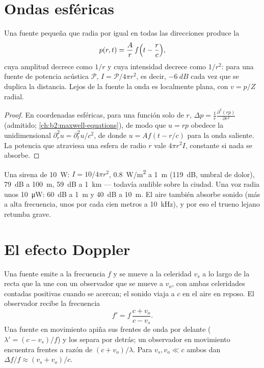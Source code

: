 \section{Ondas esféricas}

\begin{proposition}\label{prop:b2:sound-waves:spherical}
Una fuente pequeña que radia por igual en todas las direcciones produce la
\[
p(r, t) = \frac{A}{r}\,f\Bigl(t - \frac rc\Bigr) ,
\]
cuya amplitud decrece como $1/r$ y cuya intensidad decrece como $1/r^2$:
para una fuente de potencia acústica $\mathcal P$, $I = \mathcal P/4\pi r^2$, es decir,
$-\qty{6}{dB}$ cada vez que se duplica la distancia. Lejos de la fuente la
onda es localmente plana, con $v = p/Z$ radial.
\end{proposition}

\begin{proof}
En coordenadas esféricas, para una función solo de $r$, $\Delta p =
\frac1r\frac{\partial^2(rp)}{\partial r^2}$ (admitido; \cref{ch:b2:maxwell-equations}),
de modo que $u = rp$ obedece la  unidimensional $\partial_r^2u = \partial_t^2u/c^2$,
de donde $u = Af(t - r/c)$ para la onda saliente. La potencia que atraviesa una
esfera de radio $r$ vale $4\pi r^2I$, constante si nada se absorbe.
\end{proof}

\begin{example}\label{ex:b2:sound-waves:siren}
Una sirena de \qty{10}{W}: $I = 10/4\pi r^2$, \qty{0.8}{W/m^2} a \qty{1}{m} (\qty{119}{dB},
umbral de dolor), \qty{79}{dB} a \qty{100}{m}, \qty{59}{dB} a \qty{1}{km} --- todavía audible sobre
la ciudad. Una voz radia unos \qty{10}{\micro W}: \qty{60}{dB} a \qty{1}{m}
y \qty{40}{dB} a \qty{10}{m}. El aire también absorbe sonido (más a alta
frecuencia, unos  por cada cien metros a \qty{10}{kHz}), y por eso
el trueno lejano retumba grave.
\end{example}

\section{El efecto Doppler}

\begin{theorem}\label{thm:b2:sound-waves:doppler}
Una fuente emite a la frecuencia $f$ y se mueve a la celeridad $v_s$ a lo
largo de la recta que la une con un observador que se mueve a $v_o$, con
ambas celeridades contadas positivas cuando se acercan; el sonido viaja a
$c$ en el aire en reposo. El observador recibe la frecuencia
\[
f' = f\,\frac{c + v_o}{c - v_s} .
\]
Una fuente en movimiento apiña sus frentes de onda por delante ($\lambda' = (c - v_s)/f$)
y los separa por detrás; un observador en movimiento encuentra frentes a
razón de $(c + v_o)/\lambda$. Para $v_s, v_o \ll c$ ambos dan $\Delta f/f \approx
(v_s + v_o)/c$.
\end{theorem}

